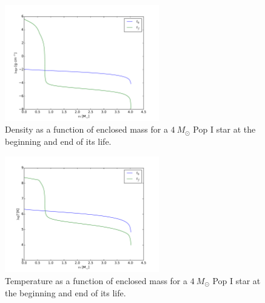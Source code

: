 \documentclass[12pt]{paper}
\begin{document}
\begin{figure}
\begin{center}
    \includegraphics[width=0.6\textwidth]{dens.pdf}
    \caption{Density as a function of enclosed mass for a $4~M_\odot$ Pop I star at the beginning and end of its life.}
    \label{fig:dse}
\end{center}
\end{figure}

\begin{figure}
\begin{center}
    \includegraphics[width=0.6\textwidth]{temp.pdf}
    \caption{Temperature as a function of enclosed mass for a $4~M_\odot$ Pop I star at the beginning and end of its life.}
    \label{fig:tse}
\end{center}
\end{figure}

\setlength\bibsep{0pt}


\end{document}
